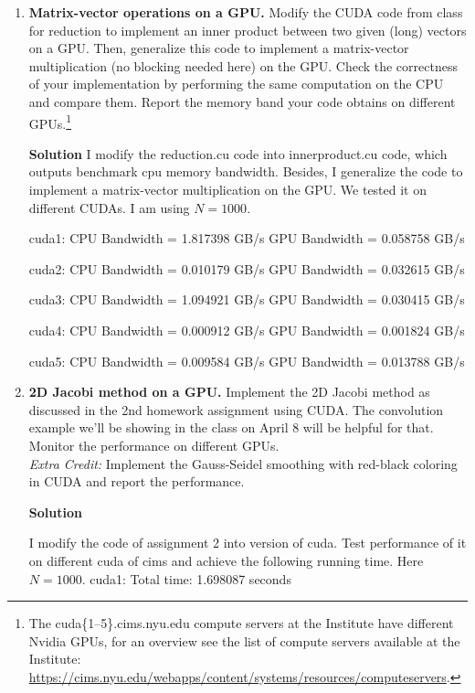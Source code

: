 \documentclass[12pt]{article}
\begin{document}
\begin{enumerate}

\item {\bf Matrix-vector operations on a GPU.} Modify the
  CUDA code from class for reduction to implement an inner product between two given
  (long) vectors on a GPU. Then, generalize this code to implement a
  matrix-vector multiplication (no blocking needed here) on the
  GPU. Check the correctness of your implementation by performing the same
  computation on the CPU and compare them. Report the memory band your
  code obtains
  on different GPUs.\footnote{The cuda\{1--5\}.cims.nyu.edu compute servers at
  the Institute have different Nvidia GPUs, for an overview see the list of
  compute servers available at the Institute:
  \url{https://cims.nyu.edu/webapps/content/systems/resources/computeservers}.}
  
 \textbf{Solution}
 I modify the reduction.cu code into innerproduct.cu code, which outputs benchmark cpu memory bandwidth. Besides, I generalize the code to implement a matrix-vector multiplication on the GPU. We tested it on different CUDAs. I am using $N = 1000$.
 
cuda1: 
CPU Bandwidth = 1.817398 GB/s
GPU Bandwidth = 0.058758 GB/s

cuda2: 
CPU Bandwidth = 0.010179 GB/s
GPU Bandwidth = 0.032615 GB/s

cuda3: 
CPU Bandwidth = 1.094921 GB/s
GPU Bandwidth = 0.030415 GB/s

cuda4:
CPU Bandwidth = 0.000912 GB/s
GPU Bandwidth = 0.001824 GB/s

cuda5:
CPU Bandwidth = 0.009584 GB/s
GPU Bandwidth = 0.013788 GB/s
  
\item {\bf 2D Jacobi method on a GPU.}
  Implement the 2D Jacobi method as discussed in the 2nd homework
  assignment using CUDA. The convolution example we'll be showing in
  the class on April 8 will be helpful for that. Monitor the
  performance on different GPUs.\\
  {\em Extra Credit:} Implement the Gauss-Seidel smoothing with
  red-black coloring in CUDA and report the performance.

\textbf{Solution}

I modify the code of assignment 2 into version of cuda. Test performance of it on different cuda of cims and achieve the following running time. Here $N = 1000$.
cuda1: 
Total time:   1.698087 seconds


\end{enumerate}
\end{document}
